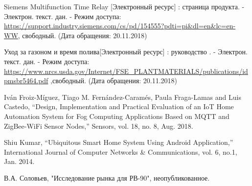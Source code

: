 \begin{my_enumerate}
\item Siemens Multifunction Time Relay  [Электронный ресурс] : страница продукта. - Электрон. текст. дан. - Режим доступа:  \url{https://support.industry.siemens.com/cs/pd/154555?pdti=pi&dl=en&lc=en-WW}, свободный. (Дата обращения: 20.11.2018)

\item Уход за газоном и время полива[Электронный ресурс] : руководство . - Электрон. текст. дан. - Режим доступа: \url{https://www.nrcs.usda.gov/Internet/FSE_PLANTMATERIALS/publications/idpmsbr5464.pdf} ,свободный. (Дата обращения: 20.11.2018)

\item Iván Froiz-Míguez, Tiago M. Fernández-Caramés, Paula Fraga-Lamas and Luis Castedo, “Design, Implementation and Practical Evaluation of an IoT Home Automation System for Fog Computing Applications Based on MQTT and ZigBee-WiFi Sensor Nodes,” Sensors, vol. 18, no. 8, Aug. 2018.

\item Shiu Kumar, “Ubiquitous Smart Home System Using Android Application,” International Journal of Computer Networks \& Communications, vol. 6, no.1, Jan. 2014. 

\item В.А. Соловьев, "Исследование рынка для РВ-90", неопубликованное.

\end{my_enumerate}

